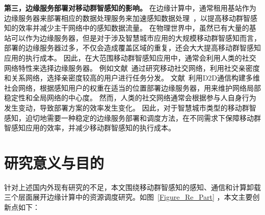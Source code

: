 

\textbf{第三，边缘服务部署对移动群智感知的影响。}
在边缘计算中，通常租用基站作为边缘服务器来部署相应的数据处理服务来加速感知数据处理~\cite{DBLP:journals/fgcs/TarnebergMWTEKE17,DBLP:journals/ton/ChenJLF16,DBLP:conf/IEEEcloud/HabakAHZ15}，以提高移动群智感知的效率并减少主干网络中的感知数据流量。
在物理世界中，虽然已有大量的基站可以作为边缘服务器，但是对于涉及智慧城市应用的大规模移动群智感知而言，部署的边缘服务器过多，不仅会造成覆盖区域的重复，还会大大提高移动群智感知应用的执行成本。
因此，在大范围移动群智感知应用中，通常会利用人类的社交网络特性来选择边缘服务器。
例如文献~通过研究移动社交网络，利用社交亲密度和关系网络，选择亲密度较高的用户进行任务分发。
文献~利用D2D通信构建多维社会网络，根据感知用户的权重在适当的位置部署边缘服务器，用来维护网络局部稳定性和全局网络的中心度。
然而，人类的社交网络通常会根据参与人自身行为发生变动，导致部署方案的效率发生变化。
因此，对于智慧城市类型的移动群智感知，迫切地需要一种稳定的边缘服务部署和调度方法，在不同需求下保障移动群智感知应用的效率，并减少移动群智感知的执行成本。


\section{研究意义与目的}

针对上述国内外现有研究的不足，本文围绕移动群智感知的感知、通信和计算卸载三个层面展开边缘计算中的资源调度研究。如图~\ref{Figure_Re_Part} ，本文主要创新点如下：

